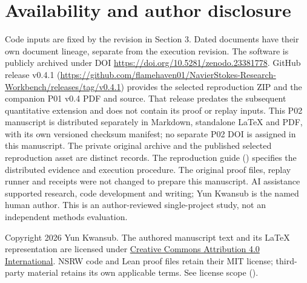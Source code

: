 \documentclass[11pt,a4paper]{article}
\begin{document}
\section*{Availability and author disclosure}

Code inputs are fixed by the revision in Section 3. Dated documents \cite{ref7,ref8,ref9,ref10} have their own document lineage, separate from the execution revision. The software is publicly archived under DOI \url{https://doi.org/10.5281/zenodo.23381778}. GitHub release v0.4.1 (\url{https://github.com/flamehaven01/NavierStokes-Research-Workbench/releases/tag/v0.4.1}) provides the selected reproduction ZIP and the companion P01 v0.4 PDF and source. That release predates the subsequent quantitative extension and does not contain its proof or replay inputs. This P02 manuscript is distributed separately in Markdown, standalone LaTeX and PDF, with its own versioned checksum manifest; no separate P02 DOI is assigned in this manuscript. The private original archive and the published selected reproduction asset are distinct records. The reproduction guide () specifies the distributed evidence and execution procedure. The original proof files, replay runner and receipts were not changed to prepare this manuscript. AI assistance supported research, code development and writing; Yun Kwansub is the named human author. This is an author-reviewed single-project study, not an independent methods evaluation.

Copyright \textcopyright{} 2026 Yun Kwansub. The authored manuscript text and its LaTeX representation are licensed under \href{https://creativecommons.org/licenses/by/4.0/}{Creative Commons Attribution 4.0 International}. NSRW code and Lean proof files retain their MIT license; third-party material retains its own applicable terms. See license scope ().
\end{document}
